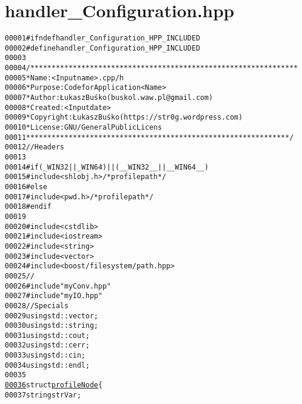 \hypertarget{handler__Configuration_8hpp_source}{
\section{handler\_\-Configuration.hpp}
}


\begin{footnotesize}\begin{alltt}
00001 \textcolor{preprocessor}{#ifndef handler\_Configuration\_HPP\_INCLUDED}
00002 \textcolor{preprocessor}{}\textcolor{preprocessor}{#define handler\_Configuration\_HPP\_INCLUDED}
00003 \textcolor{preprocessor}{}
00004 \textcolor{comment}{/***************************************************************}
00005 \textcolor{comment}{ * Name:      <Input name>.cpp/h}
00006 \textcolor{comment}{ * Purpose:   Code for Application <Name>}
00007 \textcolor{comment}{ * Author:    Łukasz Buśko (buskol.waw.pl@gmail.com)}
00008 \textcolor{comment}{ * Created:   <Input date>}
00009 \textcolor{comment}{ * Copyright: Łukasz Buśko (https://str0g.wordpress.com)}
00010 \textcolor{comment}{ * License:   GNU / General Public Licens}
00011 \textcolor{comment}{ **************************************************************/}
00012 \textcolor{comment}{//Headers}
00013 
00014 \textcolor{preprocessor}{#if ( \_WIN32 ||  \_WIN64) || ( \_\_WIN32\_\_ || \_\_WIN64\_\_ )}
00015 \textcolor{preprocessor}{}\textcolor{preprocessor}{    #include <shlobj.h>} \textcolor{comment}{/*profile path*/}
00016 \textcolor{preprocessor}{#else}
00017 \textcolor{preprocessor}{}\textcolor{preprocessor}{    #include <pwd.h>} \textcolor{comment}{/*profile path*/}
00018 \textcolor{preprocessor}{#endif}
00019 \textcolor{preprocessor}{}
00020 \textcolor{preprocessor}{#include <cstdlib>}
00021 \textcolor{preprocessor}{#include <iostream>}
00022 \textcolor{preprocessor}{#include <string>}
00023 \textcolor{preprocessor}{#include <vector>}
00024 \textcolor{preprocessor}{#include <boost/filesystem/path.hpp>}
00025 \textcolor{comment}{//}
00026 \textcolor{preprocessor}{#include "myConv.hpp"}
00027 \textcolor{preprocessor}{#include "myIO.hpp"}
00028 \textcolor{comment}{//Specials}
00029 \textcolor{keyword}{using} std::vector;
00030 \textcolor{keyword}{using} std::string;
00031 \textcolor{keyword}{using} std::cout;
00032 \textcolor{keyword}{using} std::cerr;
00033 \textcolor{keyword}{using} std::cin;
00034 \textcolor{keyword}{using} std::endl;
00035 
\hypertarget{handler__Configuration_8hpp_source_l00036}{}\hyperlink{structprofileNode}{00036} \textcolor{keyword}{struct }\hyperlink{structprofileNode}{profileNode}\{
00037     \textcolor{keywordtype}{string} strVar;

\end{alltt}
\end{footnotesize}
